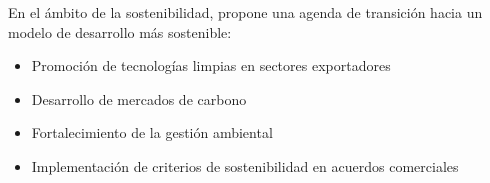 \documentclass[12pt, a4paper]{article}
\begin{document}
En el ámbito de la sostenibilidad, \textcite{castro2021agenda} propone una agenda de transición hacia un modelo de desarrollo más sostenible:
\begin{itemize}
    \item Promoción de tecnologías limpias en sectores exportadores
    \item Desarrollo de mercados de carbono
    \item Fortalecimiento de la gestión ambiental
    \item Implementación de criterios de sostenibilidad en acuerdos comerciales
\end{itemize}


\printbibliography
\end{document}
